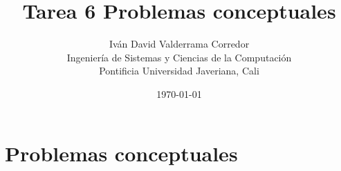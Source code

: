 \documentclass[a4paper,12pt]{article}
\title{Tarea 6 Problemas conceptuales}
\author{%
  Iván David Valderrama Corredor\\ %
  Ingeniería de Sistemas y Ciencias de la Computación\\ %
  Pontificia Universidad Javeriana, Cali}
\date{\today}
\newcommand{\subfigureautorefname}{\figureautorefname}
\begin{document}
	
\renewcommand{\tablename}{\bfseries Tabla} %
\renewcommand{\figurename}{\bfseries Figura} %
%
\maketitle

\tableofcontents

\newpage


\section{Problemas conceptuales}
\end{document}
